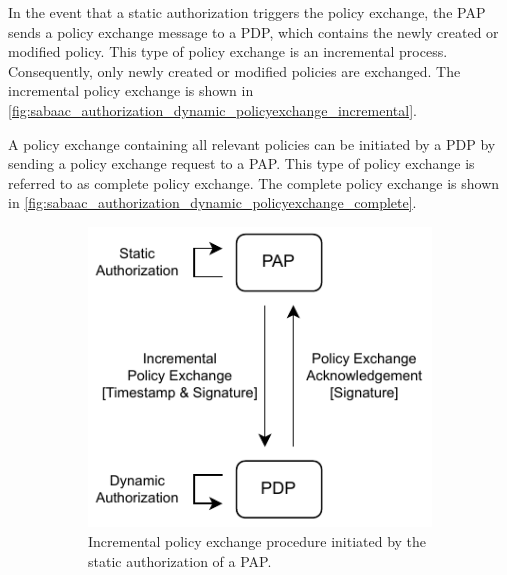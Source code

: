 \begin{description}
    In the event that a static authorization triggers the policy exchange, the PAP sends a policy exchange message to a PDP, which contains the newly created or modified policy.
    This type of policy exchange is an incremental process.
    Consequently, only newly created or modified policies are exchanged.
    The incremental policy exchange is shown in \autoref{fig:sabaac_authorization_dynamic_policyexchange_incremental}.

    A policy exchange containing all relevant policies can be initiated by a PDP by sending a policy exchange request to a PAP.
    This type of policy exchange is referred to as complete policy exchange.
    The complete policy exchange is shown in \autoref{fig:sabaac_authorization_dynamic_policyexchange_complete}.
    \begin{figure}
        \centering
        \begin{subfigure}[t]{0.48\linewidth}
            \centering
            \includegraphics[width=\linewidth]{figures/SABAAC_protocols_authorization_dynamic_policyexchange_incremental.drawio.pdf}
            \caption{Incremental policy exchange procedure initiated by the static authorization of a PAP.}
            \label{fig:sabaac_authorization_dynamic_policyexchange_incremental}
        \end{subfigure}
        \hfill
        \begin{subfigure}[t]{0.48\linewidth}
            \centering

\end{subfigure}
\end{figure}
\end{description}
